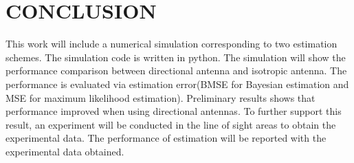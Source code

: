 \chapter{CONCLUSION}
This work will include a numerical simulation corresponding to two estimation schemes. The simulation code is written in python. The simulation will show the performance comparison between directional antenna and isotropic antenna. The performance is evaluated via estimation error(BMSE for Bayesian estimation and MSE for maximum likelihood estimation). Preliminary results shows that performance improved when using directional antennas. To further support this result, an experiment will be conducted in the line of sight areas to obtain the experimental data. The performance of estimation will be reported with the experimental data obtained.